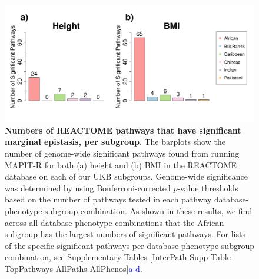 \begin{figure}[htbp]
\centering
\hspace*{-.9cm}
\includegraphics[scale=.45]{Images/Supp/InterPath_Supp_Figure_Barplots_REACTOME_vs4.png}
\caption[TBD]{\textbf{Numbers of REACTOME pathways that have significant marginal epistasis, per subgroup}. The barplots show the number of genome-wide significant pathways found from running MAPIT-R for both (a) height and (b) BMI in the REACTOME database on each of our UKB subgroups. Genome-wide significance was determined by using Bonferroni-corrected $p$-value thresholds based on the number of pathways tested in each pathway database-phenotype-subgroup combination. As shown in these results, we find across all database-phenotype combinations that the African subgroup has the largest numbers of significant pathways. For lists of the specific significant pathways per database-phenotype-subgroup combination, see Supplementary Tables \ref{InterPath-Supp-Table-TopPathways-AllPaths-AllPhenos}\textcolor{blue}{a-d}.}
\label{InterPath-Supp-Figure-Barplots-REACTOME}
\end{figure}
\clearpage

